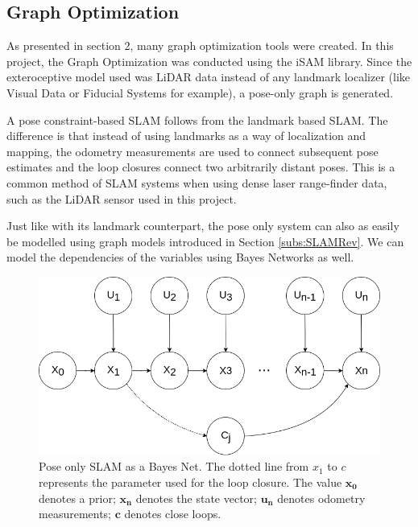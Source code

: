 \documentclass[11pt]{article}
\begin{document}
	\subsection{Graph Optimization}
	\label{subs:GraphOpt}

As presented in section 2, many graph optimization tools were created. In this project, the Graph Optimization was conducted using the iSAM library. Since the exteroceptive model used was LiDAR data instead of any landmark localizer (like Visual Data or Fiducial Systems for example), a pose-only graph is generated.

A pose constraint-based SLAM follows from the landmark based SLAM. The difference is that instead of using landmarks as a way of localization and mapping, the odometry measurements are used to connect subsequent pose estimates and the loop closures connect two arbitrarily distant poses. This is a common method of SLAM systems when using dense laser range-finder data, such as the LiDAR sensor used in this project. 

Just like with its landmark counterpart, the pose only system can also as easily be modelled using graph models introduced in Section \ref{subs:SLAMRev}. We can model the dependencies of the variables using Bayes Networks as well.
	
\begin{figure}
\begin{minipage}{0.65\textwidth}
\centering
\includegraphics[width=\textwidth]{BayesNetSLAMPoseOnly}
\end{minipage} \hfill
\begin{minipage}{0.35\textwidth}
\centering
\caption{Pose only SLAM as a Bayes Net. The dotted line from $x_1$ to $c$ represents the parameter used for the loop closure. The value $\mathbf{x_0}$ denotes a prior; $\mathbf{x_n}$ denotes the state vector; $\mathbf{u_n}$ denotes odometry measurements; $\mathbf{c}$ denotes close loops.}
\label{fig:slam2}
\end{minipage}				
\end{figure}
\end{document}
